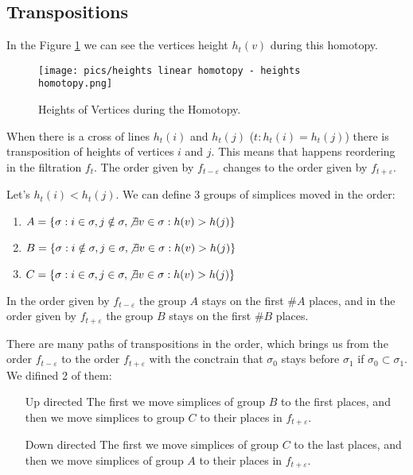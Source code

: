 \subsection{Transpositions}
\par In the Figure \ref{fig:homotopy} we can see the vertices height $h_t(v)$ during this homotopy. 
\begin{figure}[h!]
    \centering
    \texttt{[image: pics/heights linear homotopy - heights homotopy.png]}
    \caption{Heights of Vertices during the Homotopy.}
    \label{fig:homotopy}
\end{figure}
\par When there is a cross of lines $h_t(i)$ and $h_t(j)$ ($t: h_t(i) = h_t(j)$) there is transposition of heights of vertices $i$ and $j$. This means that happens reordering in the filtration $f_t$. The order given by $f_{t - \varepsilon}$ changes to the order given by $f_{t + \varepsilon}$.
\par Let's $h_t(i) < h_t(j)$. We can define 3 groups of simplices moved in the order:
\begin{enumerate}
    \item $A = \{\sigma: i \in \sigma, j\notin \sigma, \not\exists v\in \sigma: h(v) > h(j)\}$
    \item $B = \{\sigma: i \notin \sigma, j\in \sigma, \not\exists v\in \sigma: h(v) > h(j)\}$
    \item $C = \{\sigma: i \in \sigma, j\in \sigma, \not\exists v\in \sigma: h(v) > h(j)\}$
\end{enumerate}

In the order given by $f_{t - \varepsilon}$ the group $A$ stays on the first $\#A$ places, and in the order given by $f_{t + \varepsilon}$ the group $B$ stays on the first $\#B$ places.
\par There are many paths of transpositions in the order, which brings us from the order $f_{t - \varepsilon}$ to the order $f_{t + \varepsilon}$ with the conctrain that $\sigma_0$ stays before $\sigma_1$ if $\sigma_0 \subset \sigma_1$. We difined 2 of them:
\begin{itemize}
    \item[Up directed] The first we move simplices of group $B$ to the first places, and then we move simplices to group $C$ to their places in $f_{t + \varepsilon}$.
    \item[Down directed] The first we move simplices of group $C$ to the last places, and then we move simplices of group $A$ to their places in $f_{t + \varepsilon}$.
\end{itemize}
